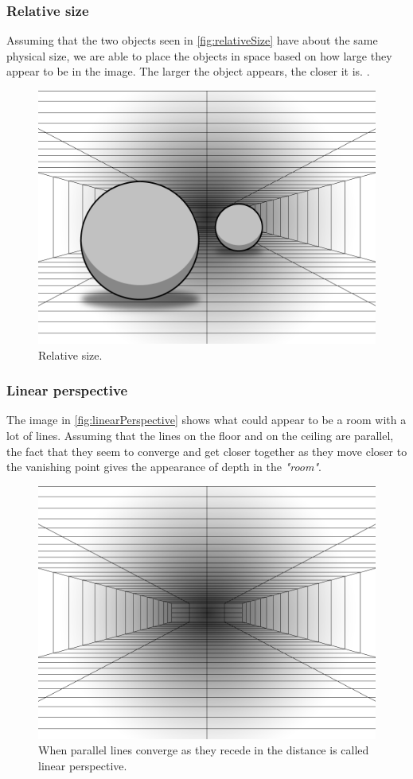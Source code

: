 \subsubsection{Relative size}
Assuming that the two objects seen in \autoref{fig:relativeSize} have about the same physical size, we are able to place the objects in space based on how large they appear to be in the image. The larger the object appears, the closer it is. \citep{sensationPerception}.
\begin{figure}[H]
	\centering
	\includegraphics[width=0.8\linewidth]{figure/Analysis/relativeSize.png}
	\caption{Relative size.}
	\label{fig:relativeSize}
\end{figure}

\subsubsection{Linear perspective}
The image in \autoref{fig:linearPerspective} shows what could appear to be a room with a lot of lines. Assuming that the lines on the floor and on the ceiling are parallel, the fact that they seem to converge and get closer together as they move closer to the vanishing point gives the appearance of depth in the \textit{"room"}\citep{sensationPerception}.
\begin{figure}[H]
	\centering
	\includegraphics[width=0.8\linewidth]{figure/Analysis/linearPerspective.png}
	\caption{When parallel lines converge as they recede in the distance is called linear perspective.}
	\label{fig:linearPerspective}
\end{figure}

